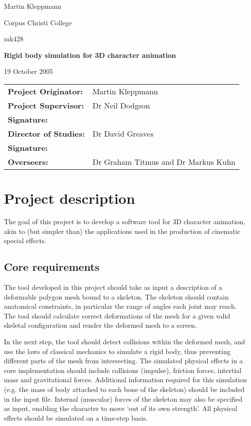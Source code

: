 \documentclass{article}
\begin{document}
{\hfill Martin Kleppmann}

{\hfill Corpus Christi College}

{\hfill mk428}

\vspace{3cm}
\centerline{\Large\bf Rigid body simulation for 3D character animation}
\vspace{1cm}
\centerline{19 October 2005}

\vspace{3cm}
\begin{tabular}{ll}
{\bf Project Originator:} & Martin Kleppmann \vspace{1.5cm}\\
{\bf Project Supervisor:} & Dr Neil Dodgson \vspace{0.5cm}\\
{\bf Signature:} & \vspace{1.5cm}\\
{\bf Director of Studies:} & Dr David Greaves \vspace{0.5cm}\\
{\bf Signature:} & \vspace{1.5cm}\\
{\bf Overseers:} & Dr Graham Titmus and Dr Markus Kuhn\\
\end{tabular}
\newpage

\section*{Project description}

The goal of this project is to develop a software tool for 3D character
animation, akin to (but simpler than) the applications used in the
production of cinematic special effects.

\subsection*{Core requirements}

The tool developed in this project should take as input a description
of a deformable polygon mesh bound to a skeleton. The skeleton should
contain anatomical constraints, in particular the range of angles each
joint may reach. The tool should calculate correct deformations of the
mesh for a given valid skeletal configuration and render the deformed
mesh to a screen.

In the next step, the tool should detect collisions within the
deformed mesh, and use the laws of classical mechanics to simulate a
rigid body, thus preventing different parts of the mesh from
intersecting. The simulated physical effects in a core implementation
should include collisions (impulse), friction forces, intertial mass
and gravitational forces. Additional information required for this
simulation (e.g. the mass of body attached to each bone of the
skeleton) should be included in the input file. Internal (muscular)
forces of the skeleton may also be specified as input, enabling the
character to move `out of its own strength'. All physical effects
should be simulated on a time-step basis.
\end{document}
